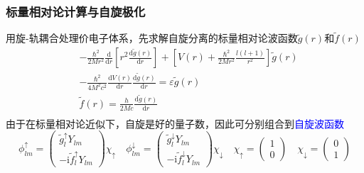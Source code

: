 \frame
{
	\frametitle{标量相对论计算与自旋极化}
	用旋-轨耦合处理价电子体系，先求解自旋分离的标量相对论波函数$\tilde{g}(r)$和$\tilde{f}(r)$
	\begin{displaymath}
		\begin{aligned}
			&-\frac{\hbar^2}{2Mr^2}\frac{\mathrm{d}}{\mathrm{d}r}\left[ r^2\frac{\mathrm{d}\tilde{g}(r)}{\mathrm{d}r} \right]+\left[ V(r)+\frac{\hbar^2}{2Mr^2}\frac{l(l+1)}{r^2} \right]\tilde{g}(r)\\
			&-\frac{\hbar^2}{4M^2c^2}\frac{\mathrm{d}V(r)}{\mathrm{d}r}\frac{\mathrm{d}\tilde{g}(r)}{\mathrm{d}r}=\varepsilon\tilde{g}(r)\\
			&\tilde{f}(r)=\frac{h}{2Mc}\frac{\mathrm{d}\tilde{g}(r)}{\mathrm{d}r}\\
		\end{aligned}
	\end{displaymath}
	由于在标量相对论近似下，自旋是好的量子数，因此可分别组合到\textcolor{blue}{自旋波函数}
	\begin{displaymath}
		\phi_{lm}^{\uparrow}=\left( 
		\begin{matrix}
			\tilde{g}_l^{\uparrow}Y_{lm}\\
			-\mathrm{i}\tilde{f}_l^{\uparrow}Y_{lm}
		\end{matrix}
		\right)\chi_{\uparrow}\quad
		\phi_{lm}^{\downarrow}=\left( 
		\begin{matrix}
			\tilde{g}_l^{\downarrow}Y_{lm}\\
			-\mathrm{i}\tilde{f}_l^{\downarrow}Y_{lm}
		\end{matrix}
		\right)\chi_{\downarrow}\quad
		\chi_{\uparrow}=\left( 
		\begin{matrix}
			1\\
			0
		\end{matrix}
		\right)\quad
		\chi_{\downarrow}=\left( 
		\begin{matrix}
			0\\
			1
		\end{matrix}
		\right)
	\end{displaymath}
}

